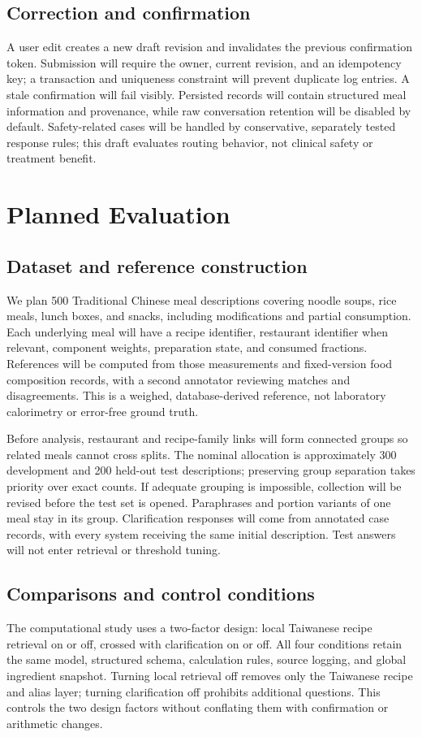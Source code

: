 \documentclass[11pt,a4paper]{article}
\begin{document}
\subsection{Correction and confirmation}
A user edit creates a new draft revision and invalidates the previous confirmation token. Submission will require the owner, current revision, and an idempotency key; a transaction and uniqueness constraint will prevent duplicate log entries. A stale confirmation will fail visibly. Persisted records will contain structured meal information and provenance, while raw conversation retention will be disabled by default. Safety-related cases will be handled by conservative, separately tested response rules; this draft evaluates routing behavior, not clinical safety or treatment benefit.

\section{Planned Evaluation}
\subsection{Dataset and reference construction}
We plan 500 Traditional Chinese meal descriptions covering noodle soups, rice meals, lunch boxes, and snacks, including modifications and partial consumption. Each underlying meal will have a recipe identifier, restaurant identifier when relevant, component weights, preparation state, and consumed fractions. References will be computed from those measurements and fixed-version food composition records, with a second annotator reviewing matches and disagreements. This is a weighed, database-derived reference, not laboratory calorimetry or error-free ground truth.

Before analysis, restaurant and recipe-family links will form connected groups so related meals cannot cross splits. The nominal allocation is approximately 300 development and 200 held-out test descriptions; preserving group separation takes priority over exact counts. If adequate grouping is impossible, collection will be revised before the test set is opened. Paraphrases and portion variants of one meal stay in its group. Clarification responses will come from annotated case records, with every system receiving the same initial description. Test answers will not enter retrieval or threshold tuning.

\subsection{Comparisons and control conditions}
The computational study uses a two-factor design: local Taiwanese recipe retrieval on or off, crossed with clarification on or off. All four conditions retain the same model, structured schema, calculation rules, source logging, and global ingredient snapshot. Turning local retrieval off removes only the Taiwanese recipe and alias layer; turning clarification off prohibits additional questions. This controls the two design factors without conflating them with confirmation or arithmetic changes.
\end{document}
